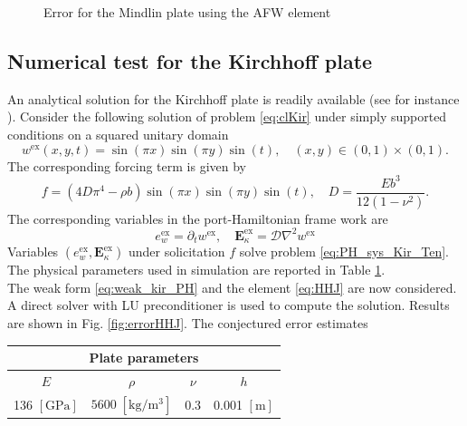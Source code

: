 \documentclass{ifacconf}
\begin{document}
\begin{figure}[ht]
	\caption[errorAFW]{Error for the Mindlin plate using the AFW element}%
	\label{fig:errorAFW}%
\end{figure}

 
\subsection{Numerical test for the Kirchhoff plate}
An analytical solution for the Kirchhoff plate is readily available (see for instance \cite{reddy2006theory}). Consider the following solution of problem \eqref{eq:clKir} under simply supported conditions on a squared unitary domain
\[
w^{\text{ex}}(x,y,t) = \sin(\pi x) \sin(\pi y) \sin(t), \quad  (x, y) \in (0,1)\times (0,1).
\] 
The corresponding forcing term is given by 
\[
f = (4 D \pi^4 - \rho b) \sin(\pi x) \sin(\pi y) \sin(t), \quad D = \frac{E b^3}{12 (1-\nu^2)}.
\]
The corresponding variables in the port-Hamiltonian frame work are
\[
e_w^{\text{ex}} = \partial_t w^{\text{ex}}, \quad \bm{E}_\kappa^{\text{ex}} = \mathcal{D} \nabla^2 w^{\text{ex}}
\]
Variables $(e_w^{\text{ex}}, \bm{E}_\kappa^{\text{ex}})$ under solicitation $f$ solve problem \eqref{eq:PH_sys_Kir_Ten}. The physical parameters used in simulation are reported in Table \ref{tab:parKir}. \\
The weak form \eqref{eq:weak_kir_PH} and the element \eqref{eq:HHJ} are now considered.
A direct solver with LU preconditioner is used to compute the solution. Results are shown in Fig. \ref{fig:errorHHJ}. The conjectured error estimates
\begin{table}[h]
	\centering
	\begin{tabular}{cccc}
		\hline 
		\multicolumn{4}{c}{Plate parameters} \\ 
		\hline 
		$E$ & $\rho$ & $\nu$  & $h$ \\
		136 $[\textrm{GPa}]$ & $5600\; [\textrm{kg}/\textrm{m}^3]$ & 0.3 &  0.001 $[\textrm{m}]$\\ 
		\hline 
	\end{tabular} 
	\captionsetup{width=0.95\linewidth}
	\vspace{1mm}
	\label{tab:parKir}
\end{table}
\end{document}
